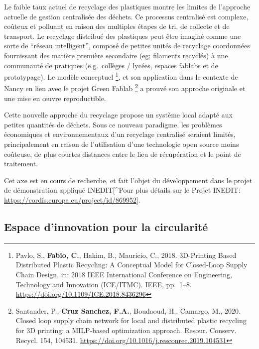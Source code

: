 \documentclass[
  12pt,
  oneside]{book}
\begin{document}
Le faible taux actuel de recyclage des plastiques montre les limites de l'approche actuelle de gestion centralisée des déchets. Ce processus centralisé est complexe, coûteux et polluant en raison des multiples étapes de tri, de collecte et de transport. Le recyclage distribué des plastiques peut être imaginé comme une sorte de ``réseau intelligent'', composé de petites unités de recyclage coordonnées fournissant des matière première secondaire (eg: filaments recyclés) à une communauté de pratiques (e.g.~collèges / lycées, espaces fablabs et de prototypage). Le modèle conceptuel \footnote{Pavlo, S., \textbf{Fabio, C.}, Hakim, B., Mauricio, C., 2018. 3D-Printing Based Distributed Plastic Recycling: A Conceptual Model for Closed-Loop Supply Chain Design, in: 2018 IEEE International Conference on Engineering, Technology and Innovation (ICE/ITMC). IEEE, pp.~1--8. \url{https://doi.org/10.1109/ICE.2018.8436296}}, et son application dans le contexte de Nancy en lien avec le projet Green Fablab \footnote{Santander, P., \textbf{Cruz Sanchez, F.A.}, Boudaoud, H., Camargo, M., 2020. Closed loop supply chain network for local and distributed plastic recycling for 3D printing: a MILP-based optimization approach. Resour. Conserv. Recycl. 154, 104531. \url{https://doi.org/10.1016/j.resconrec.2019.104531}} a prouvé son approche originale et une mise en œuvre reproductible.

Cette nouvelle approche du recyclage propose un système local adapté aux petites quantités de déchets. Sous ce nouveau paradigme, les problèmes économiques et environnementaux d'un recyclage centralisé seraient limités, principalement en raison de l'utilisation d'une technologie open source moins coûteuse, de plus courtes distances entre le lieu de récupération et le point de traitement.

Cet axe est en cours de recherche, et fait l'objet du développement dans le projet de démonstration appliqué INEDIT{[}\^{}Pour plus détails sur le Projet INEDIT: \url{https://cordis.europa.eu/project/id/869952}{]}.

\hypertarget{espace-dinnovation-pour-la-circularituxe9}{%
\subsection{Espace d'innovation pour la circularité}\label{espace-dinnovation-pour-la-circularituxe9}}
\end{document}

